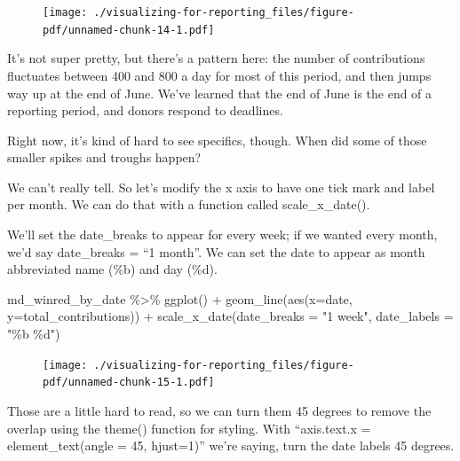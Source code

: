 \documentclass[
  letterpaper,
  DIV=11,
  numbers=noendperiod]{scrreprt}
\newenvironment{Shaded}{\begin{snugshade}}{\end{snugshade}}
\newcommand{\AttributeTok}[1]{\textcolor[rgb]{0.40,0.45,0.13}{#1}}
\newcommand{\FunctionTok}[1]{\textcolor[rgb]{0.28,0.35,0.67}{#1}}
\newcommand{\NormalTok}[1]{\textcolor[rgb]{0.00,0.23,0.31}{#1}}
\newcommand{\SpecialCharTok}[1]{\textcolor[rgb]{0.37,0.37,0.37}{#1}}
\newcommand{\StringTok}[1]{\textcolor[rgb]{0.13,0.47,0.30}{#1}}
\begin{document}
\begin{figure}[H]

{\centering \texttt{[image: ./visualizing-for-reporting\_files/figure-pdf/unnamed-chunk-14-1.pdf]}

}

\end{figure}

It's not super pretty, but there's a pattern here: the number of
contributions fluctuates between 400 and 800 a day for most of this
period, and then jumps way up at the end of June. We've learned that the
end of June is the end of a reporting period, and donors respond to
deadlines.

Right now, it's kind of hard to see specifics, though. When did some of
those smaller spikes and troughs happen?

We can't really tell. So let's modify the x axis to have one tick mark
and label per month. We can do that with a function called
scale\_x\_date().

We'll set the date\_breaks to appear for every week; if we wanted every
month, we'd say date\_breaks = ``1 month''. We can set the date to
appear as month abbreviated name (\%b) and day (\%d).

\begin{Shaded}
\begin{Highlighting}[]
\NormalTok{md\_winred\_by\_date }\SpecialCharTok{\%\textgreater{}\%}
  \FunctionTok{ggplot}\NormalTok{() }\SpecialCharTok{+} 
  \FunctionTok{geom\_line}\NormalTok{(}\FunctionTok{aes}\NormalTok{(}\AttributeTok{x=}\NormalTok{date, }\AttributeTok{y=}\NormalTok{total\_contributions)) }\SpecialCharTok{+} 
  \FunctionTok{scale\_x\_date}\NormalTok{(}\AttributeTok{date\_breaks =} \StringTok{"1 week"}\NormalTok{, }\AttributeTok{date\_labels =} \StringTok{"\%b \%d"}\NormalTok{)}
\end{Highlighting}
\end{Shaded}

\begin{figure}[H]

{\centering \texttt{[image: ./visualizing-for-reporting\_files/figure-pdf/unnamed-chunk-15-1.pdf]}

}

\end{figure}

Those are a little hard to read, so we can turn them 45 degrees to
remove the overlap using the theme() function for styling. With
``axis.text.x = element\_text(angle = 45, hjust=1)'' we're saying, turn
the date labels 45 degrees.
\end{document}
